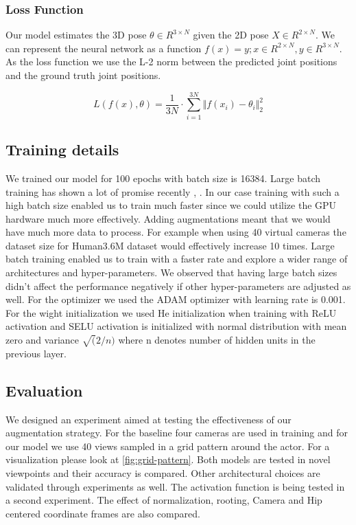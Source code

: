 \subsubsection{Loss Function}

Our model estimates the 3D pose $\theta \in R^{3\times N}$ given the 2D pose $X \in R^{2\times N}$. We can represent the neural network as a function $f(x) = y ; x \in R^{2\times N}, y \in R^{3\times N} $. As the loss function we use the L-2 norm between the predicted joint positions and the ground truth joint positions.

\begin{equation}	
    L(f(x),\theta) = \frac{1}{3N} \cdot \sum_{i=1}^{3N} {\Vert f(x_i)-\theta_i \Vert}_2^2
\end{equation}


\subsection{Training details}

We trained our model for 100 epochs with batch size is 16384. Large batch training has shown a lot of promise recently \parencite{you2017imagenet}, \parencite{goyal2017accurate}. In our case training with such a high batch size enabled us to train much faster since we could utilize the GPU hardware much more effectively. Adding augmentations meant that we would have much more data to process. For example when using 40 virtual cameras the dataset size for Human3.6M dataset would effectively increase 10 times. Large batch training enabled us to train with a faster rate and explore a wider range of architectures and hyper-parameters. We observed that having large batch sizes didn't affect the performance negatively if other hyper-parameters are adjusted as well. For the optimizer we used the ADAM optimizer with learning rate is 0.001. For the wight initialization we used He initialization when training with ReLU activation and SELU activation is initialized with normal distribution with mean zero and variance $\sqrt(2 / n)$ where n denotes number of hidden units in the previous layer. 

\subsection{Evaluation}

We designed an experiment aimed at testing the effectiveness of our augmentation strategy. For the baseline four cameras are used in training and for our model we use 40 views sampled in a grid pattern around the actor. For a visualization please look at \autoref{fig:grid-pattern}. Both models are tested in novel viewpoints and their accuracy is compared. 
Other architectural choices are validated through experiments as well. The activation function is being tested in a second experiment. The effect of normalization, rooting, Camera and Hip centered coordinate frames are also compared. 

